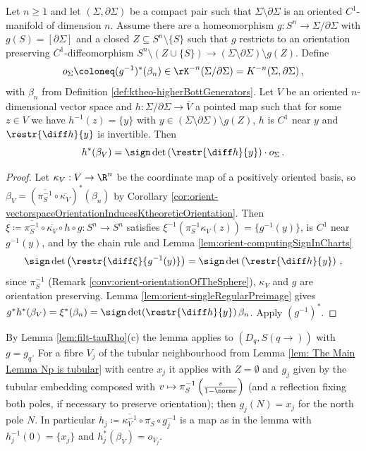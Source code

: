 \begin{lemma}\label{lem:filt-orientationClassOfDisk}
	Let $n\geq 1$ and let $(\Sigma,\partial\Sigma)$ be a compact pair such that $\Sigma\setminus\partial\Sigma$ is an oriented $C^1$-manifold of dimension $n$. Assume there are a homeomorphism $g:S^n\to\Sigma/\partial\Sigma$ with $g(S)=[\partial\Sigma]$ and a closed $Z\subseteq S^n\setminus\{S\}$ such that $g$ restricts to an orientation preserving $C^1$-diffeomorphism $S^n\setminus(Z\cup\{S\})\to (\Sigma\setminus\partial\Sigma)\setminus g(Z)$. Define
	\begin{equation*}
		o_\Sigma\coloneq (g^{-1})^*(\beta_n)\in \rK^{-n}(\Sigma/\partial\Sigma)=K^{-n}(\Sigma,\partial\Sigma)\,,
	\end{equation*}
	with $\beta_n$ from Definition \ref{def:ktheo-higherBottGenerators}. Let $V$ be an oriented $n$-dimensional vector space and $h:\Sigma/\partial\Sigma\to\overline{V}$ a pointed map such that for some $z\in V$ we have $h^{-1}(z)=\{y\}$ with $y\in(\Sigma\setminus\partial\Sigma)\setminus g(Z)$, $h$ is $C^1$ near $y$ and $\restr{\diff h}{y}$ is invertible. Then
	\begin{equation*}
		h^*(\beta_V)=\sign\det\left(\restr{\diff h}{y}\right)\cdot o_\Sigma\,.
	\end{equation*}
\end{lemma}
\begin{proof}
	Let $\kappa_V:V\to\R^n$ be the coordinate map of a positively oriented basis, so $\beta_V=\left(\overline{\pi_S^{-1}}\circ\overline{\kappa_V}\right)^*(\beta_n)$ by Corollary \ref{cor:orient-vectorspaceOrientationInducesKtheoreticOrientation}. Then $\xi\coloneq\overline{\pi_S^{-1}}\circ\overline{\kappa_V}\circ h\circ g:S^n\to S^n$ satisfies $\xi^{-1}(\pi_S^{-1}\kappa_V(z))=\{g^{-1}(y)\}$, is $C^1$ near $g^{-1}(y)$, and by the chain rule and Lemma \ref{lem:orient-computingSignInCharts}
	\begin{equation*}
		\sign\det\left(\restr{\diff\xi}{g^{-1}(y)}\right)=\sign\det\left(\restr{\diff h}{y}\right)\,,
	\end{equation*}
	since $\pi_S^{-1}$ (Remark \ref{conv:orient-orientationOfTheSphere}), $\kappa_V$ and $g$ are orientation preserving. Lemma \ref{lem:orient-singleRegularPreimage} gives $g^*h^*(\beta_V)=\xi^*(\beta_n)=\sign\det(\restr{\diff h}{y})\,\beta_n$. Apply $(g^{-1})^*$.
\end{proof}

\begin{remark}
	By Lemma \ref{lem:filt-tauRho}(c) the lemma applies to $(D_q,S(q\to))$ with $g=g_q$. For a fibre $V_j$ of the tubular neighbourhood from Lemma \ref{lem: The Main Lemma Np is tubular} with centre $x_j$ it applies with $Z=\emptyset$ and $g_j$ given by the tubular embedding composed with $v\mapsto\pi_S^{-1}\left(\frac{v}{1-\norm v}\right)$ (and a reflection fixing both poles, if necessary to preserve orientation); then $g_j(N)=x_j$ for the north pole $N$. In particular $h_j\coloneq\overline{\kappa_V^{-1}}\circ\overline{\pi_S}\circ g_j^{-1}$ is a map as in the lemma with $h_j^{-1}(0)=\{x_j\}$ and $h_j^*(\beta_V)=o_{V_j}$.
\end{remark}

